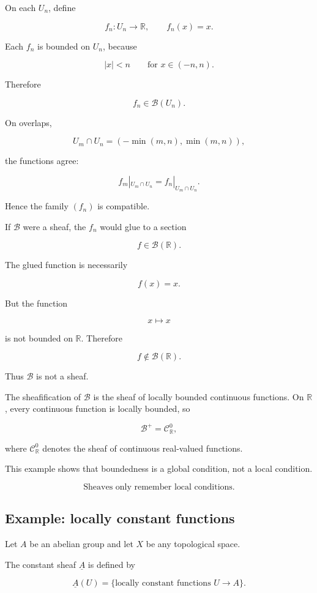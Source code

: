 \documentclass[12pt,a4paper]{article}
\theoremstyle{notespace}
\newcommand{\B}{\mathcal B}
\newcommand{\C}{\mathcal C}
\begin{document}
	On each $U_n$, define
	
	\[
	f_n:U_n\to \mathbb R,
	\qquad
	f_n(x)=x.
	\]
	
	Each $f_n$ is bounded on $U_n$, because
	
	\[
	|x|<n
	\qquad
	\text{for } x\in (-n,n).
	\]
	
	Therefore
	
	\[
	f_n\in \B(U_n).
	\]
	
	On overlaps,
	
	\[
	U_m\cap U_n=(-\min(m,n),\min(m,n)),
	\]
	
	the functions agree:
	
	\[
	f_m|_{U_m\cap U_n}=f_n|_{U_m\cap U_n}.
	\]
	
	Hence the family $(f_n)$ is compatible.
	
	If $\B$ were a sheaf, the $f_n$ would glue to a section
	
	\[
	f\in \B(\mathbb R).
	\]
	
	The glued function is necessarily
	
	\[
	f(x)=x.
	\]
	
	But the function
	
	\[
	x\mapsto x
	\]
	
	is not bounded on $\mathbb R$. Therefore
	
	\[
	f\notin \B(\mathbb R).
	\]
	
	Thus $\B$ is not a sheaf.
	
	The sheafification of $\B$ is the sheaf of locally bounded continuous functions.
	On $\mathbb R$, every continuous function is locally bounded, so
	
	\[
	\B^+
	=
	\C^0_{\mathbb R},
	\]
	
	where $\C^0_{\mathbb R}$ denotes the sheaf of continuous real-valued functions.
	
	This example shows that boundedness is a global condition, not a local
	condition.
	
	\[
	\boxed{
		\text{Sheaves only remember local conditions.}
	}
	\]
	
	\subsection{Example: locally constant functions}
	
	Let $A$ be an abelian group and let $X$ be any topological space.
	
	The constant sheaf $\underline A$ is defined by
	
	\[
	\underline A(U)
	=
	\{\text{locally constant functions } U\to A\}.
	\]
	
\end{document}
